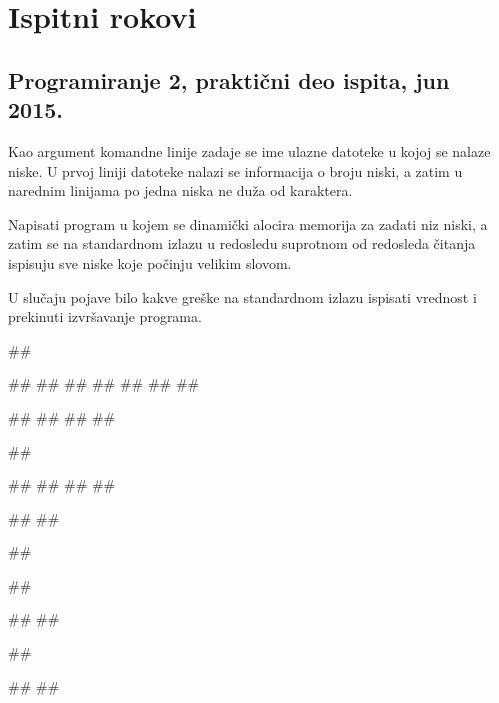 \chapter{Ispitni rokovi}

\section{Programiranje 2, praktični deo ispita, jun 2015.}

\begin{Exercise}[label=901]
Kao argument komandne linije zadaje se ime ulazne datoteke u kojoj se nalaze niske. U prvoj liniji datoteke nalazi se informacija o broju niski, a zatim u narednim linijama po jedna niska ne duža od  karaktera.
  
Napisati program u kojem se dinamički alocira memorija za zadati niz niski, a zatim se na standardnom izlazu u redosledu suprotnom od redosleda čitanja ispisuju sve niske koje počinju velikim slovom. 

U slučaju pojave bilo kakve greške na standardnom izlazu ispisati vrednost  i prekinuti izvršavanje programa.

\begin{miditest}
\begin{test}{1}
##

##
##
##
##
##
##
##
  
#\naslovIzlaz#
##
##
##
\end{test}
\end{miditest}
\begin{minitest}
\begin{test}{2}
##

##
##
##
##

#\naslovIzlaz#
#\izlaz{}#
\end{test}
\end{minitest}


\begin{miditest}
\begin{test}{3}
##

##

#\naslovIzlaz#
##
\end{test}
\end{miditest}
\begin{miditest}
\begin{test}{4}
##

#\naslovIzlaz#
##
\end{test}
\end{miditest}

\end{Exercise}
\begin{Answer}[ref=901]
\end{Answer}


